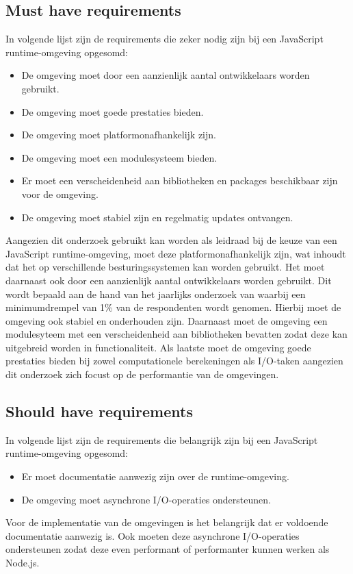 \subsection{Must have requirements}
In volgende lijst zijn de requirements die zeker nodig zijn bij een JavaScript runtime-omgeving opgesomd:
\begin{itemize}
    \item De omgeving moet door een aanzienlijk aantal ontwikkelaars worden gebruikt.
    \item De omgeving moet goede prestaties bieden.
    \item De omgeving moet platformonafhankelijk zijn.
    \item De omgeving moet een modulesysteem bieden.
    \item Er moet een verscheidenheid aan bibliotheken en packages beschikbaar zijn voor de omgeving.
    \item De omgeving moet stabiel zijn en regelmatig updates ontvangen.
\end{itemize}
Aangezien dit onderzoek gebruikt kan worden als leidraad bij de keuze van een JavaScript runtime-omgeving, 
moet deze platformonafhankelijk zijn, wat inhoudt dat het op verschillende besturingssystemen kan worden gebruikt.
Het moet daarnaast ook door een aanzienlijk aantal ontwikkelaars worden gebruikt.
Dit wordt bepaald aan de hand van het jaarlijks onderzoek van \textcite{Greif2022} 
waarbij een minimumdrempel van 1\% van de respondenten wordt genomen.
Hierbij moet de omgeving ook stabiel en onderhouden zijn.
Daarnaast moet de omgeving een modulesyteem met een verscheidenheid aan bibliotheken bevatten 
zodat deze kan uitgebreid worden in functionaliteit. 
Als laatste moet de omgeving goede prestaties bieden bij zowel computationele berekeningen als I/O-taken
aangezien dit onderzoek zich focust op de performantie van de omgevingen.

\subsection{Should have requirements}
In volgende lijst zijn de requirements die belangrijk zijn bij een JavaScript runtime-omgeving opgesomd:
\begin{itemize}
    \item Er moet documentatie aanwezig zijn over de runtime-omgeving.
    \item De omgeving moet asynchrone I/O-operaties ondersteunen.
\end{itemize}
Voor de implementatie van de omgevingen is het belangrijk dat er voldoende documentatie aanwezig is.
Ook moeten deze asynchrone I/O-operaties ondersteunen zodat deze even performant of performanter kunnen werken als Node.js.

